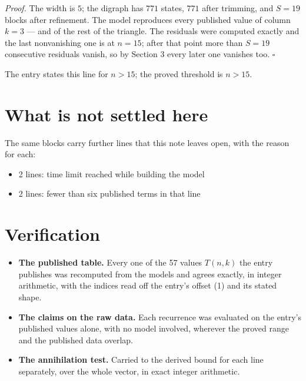 \documentclass[11pt]{article}
\theoremstyle{definition}
\begin{document}
{\itshape Proof.} The width is $5$; the digraph has $771$ states, $771$ after trimming, and $S = 19$ blocks after refinement. The model reproduces every published value of column $k = 3$ --- and of the rest of the triangle. The residuals were computed exactly and the last nonvanishing one is at $n = 15$; after that point more than $S = 19$ consecutive residuals vanish, so by Section 3 every later one vanishes too. $\square$

The entry states this line for $n > 15$; the proved threshold is $n > 15$.

\section{What is not settled here}

The same blocks carry further lines that this note leaves open, with the reason for each:

\begin{itemize}

\item 2 lines: time limit reached while building the model

\item 2 lines: fewer than six published terms in that line

\end{itemize}

\section{Verification}

\begin{itemize}

\item {\bfseries The published table.} Every one of the 57 values $T(n,k)$ the entry publishes was recomputed from the models and agrees exactly, in integer arithmetic, with the indices read off the entry's offset (1) and its stated shape.

\item {\bfseries The claims on the raw data.} Each recurrence was evaluated on the entry's published values alone, with no model involved, wherever the proved range and the published data overlap.

\item {\bfseries The annihilation test.} Carried to the derived bound for each line separately, over the whole vector, in exact integer arithmetic.

\end{itemize}
\end{document}
